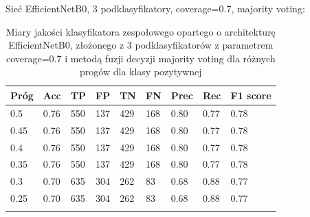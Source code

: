 \documentclass[polish,12pt]{aghthesis}
\begin{document}
\vspace{3.5mm}
\par\noindent Sieć EfficientNetB0, 3 podklasyfikatory, coverage=0.7, majority voting:
 \begin{longtable}[h!]{|m{2.0cm}|m{1.2cm}|m{1.2cm}|m{1.2cm}|m{1.2cm}|m{1.2cm}|m{1.2cm}|m{1.2cm}|m{1.6cm}|}
 \hline
 Próg & Acc & TP & FP & TN & FN & Prec & Rec & F1 score\\
 \hline
 0.5 & 0.76 & 550 & 137 & 429 & 168 & 0.80 & 0.77 & 0.78\\
 \hline
 0.45 & 0.76 & 550 & 137 & 429 & 168 & 0.80 & 0.77 & 0.78\\
 \hline
 0.4 & 0.76 & 550 & 137 & 429 & 168 & 0.80 & 0.77 & 0.78\\
 \hline
 0.35 & 0.76 & 550 & 137 & 429 & 168 & 0.80 & 0.77 & 0.78\\
 \hline
 0.3 & 0.70 & 635 & 304 & 262 & 83 & 0.68 & 0.88 & 0.77\\
 \hline
 0.25 & 0.70 & 635 & 304 & 262 & 83 & 0.68 & 0.88 & 0.77\\
 \hline
\caption{Miary jakości klasyfikatora zespołowego opartego o architekturę EfficientNetB0, złożonego z 3 podklasyfikatorów z parametrem coverage=0.7 i metodą fuzji decyzji majority voting dla różnych progów dla klasy pozytywnej}
\label{table:38}
\end{longtable}
\end{document}
